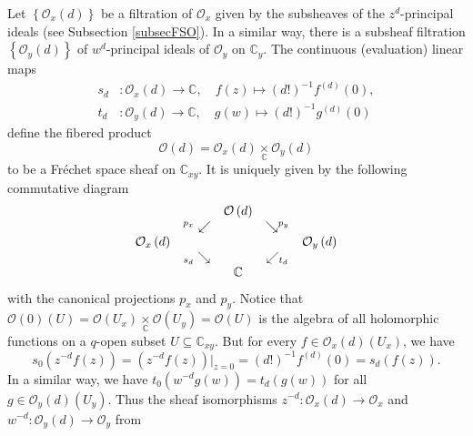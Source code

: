 \documentclass[12pt,reqno]{amsart}%
\theoremstyle{plain}
\numberwithin{theorem}{section} \numberwithin{equation}{section}
\numberwithin{lemma}{section}
\numberwithin{remark}{section}
\numberwithin{example}{section}
\numberwithin{proposition}{section}
\numberwithin{definition}{section}
\numberwithin{corollary}{section}
\begin{document}
Let $\left\{  \mathcal{O}_{x}\left(  d\right)  \right\}  $ be a filtration of
$\mathcal{O}_{x}$ given by the subsheaves of the $z^{d}$-principal ideals (see
Subsection \ref{subsecFSO}). In a similar way, there is a subsheaf filtration
$\left\{  \mathcal{O}_{y}\left(  d\right)  \right\}  $ of $w^{d}$-principal
ideals of $\mathcal{O}_{y}$ on $\mathbb{C}_{y}$. The continuous (evaluation)
linear maps
\begin{align*}
s_{d}  &  :\mathcal{O}_{x}\left(  d\right)  \rightarrow\mathbb{C},\quad
f\left(  z\right)  \mapsto\left(  d!\right)  ^{-1}f^{\left(  d\right)
}\left(  0\right)  ,\\
t_{d}  &  :\mathcal{O}_{y}\left(  d\right)  \rightarrow\mathbb{C},\quad
g\left(  w\right)  \mapsto\left(  d!\right)  ^{-1}g^{\left(  d\right)
}\left(  0\right)
\end{align*}
define the fibered product
\[
\mathcal{O}\left(  d\right)  =\mathcal{O}_{x}\left(  d\right)
\underset{\mathbb{C}}{\times}\mathcal{O}_{y}\left(  d\right)
\]
to be a Fr\'{e}chet space sheaf on $\mathbb{C}_{xy}$. It is uniquely given by
the following commutative diagram
\[%
\begin{array}
[c]{ccccc}
&  & \mathcal{O}\left(  d\right)  &  & \\
& ^{p_{x}}\swarrow &  & \searrow^{p_{y}} & \\
\mathcal{O}_{x}\left(  d\right)  &  &  &  & \mathcal{O}_{y}\left(  d\right) \\
& _{s_{d}}\searrow &  & \swarrow_{t_{d}} & \\
&  & \mathbb{C} &  &
\end{array}
\]
with the canonical projections $p_{x}$ and $p_{y}$. Notice that $\mathcal{O}%
\left(  0\right)  \left(  U\right)  =\mathcal{O}\left(  U_{x}\right)
\underset{\mathbb{C}}{\times}\mathcal{O}\left(  U_{y}\right)  =\mathcal{O}%
\left(  U\right)  $ is the algebra of all holomorphic functions on a $q$-open
subset $U\subseteq\mathbb{C}_{xy}$. But for every $f\in\mathcal{O}_{x}\left(
d\right)  \left(  U_{x}\right)  $, we have
\[
s_{0}\left(  z^{-d}f\left(  z\right)  \right)  =\left(  z^{-d}f\left(
z\right)  \right)  |_{z=0}=\left(  d!\right)  ^{-1}f^{\left(  d\right)
}\left(  0\right)  =s_{d}\left(  f\left(  z\right)  \right)  .
\]
In a similar way, we have $t_{0}\left(  w^{-d}g\left(  w\right)  \right)
=t_{d}\left(  g\left(  w\right)  \right)  $ for all $g\in\mathcal{O}%
_{y}\left(  d\right)  \left(  U_{y}\right)  $. Thus the sheaf isomorphisms
$z^{-d}:\mathcal{O}_{x}\left(  d\right)  \rightarrow\mathcal{O}_{x}$ and
$w^{-d}:\mathcal{O}_{y}\left(  d\right)  \rightarrow\mathcal{O}_{y}$ from
\end{document}
